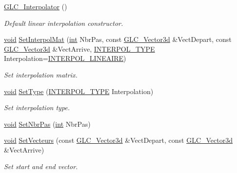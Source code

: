 \begin{DoxyCompactItemize}
\item 
\hyperlink{class_g_l_c___interpolator_acdcc7da44104df11b6f36e6ef273382b}{G\-L\-C\-\_\-\-Interpolator} ()
\begin{DoxyCompactList}\small\item\em Default linear interpolation constructor. \end{DoxyCompactList}\item 
\hyperlink{group___u_a_v_objects_plugin_ga444cf2ff3f0ecbe028adce838d373f5c}{void} \hyperlink{class_g_l_c___interpolator_af569e834641c14a0f50e16a650b00e83}{Set\-Interpol\-Mat} (\hyperlink{ioapi_8h_a787fa3cf048117ba7123753c1e74fcd6}{int} Nbr\-Pas, const \hyperlink{class_g_l_c___vector3d}{G\-L\-C\-\_\-\-Vector3d} \&Vect\-Depart, const \hyperlink{class_g_l_c___vector3d}{G\-L\-C\-\_\-\-Vector3d} \&Vect\-Arrive, \hyperlink{glc__interpolator_8h_a04f8c29ee182e2ad60d9a7a27d94e1b4}{I\-N\-T\-E\-R\-P\-O\-L\-\_\-\-T\-Y\-P\-E} Interpolation=\hyperlink{glc__interpolator_8h_a04f8c29ee182e2ad60d9a7a27d94e1b4a354ae4967893f536f9dc8384087ad56c}{I\-N\-T\-E\-R\-P\-O\-L\-\_\-\-L\-I\-N\-E\-A\-I\-R\-E})
\begin{DoxyCompactList}\small\item\em Set interpolation matrix. \end{DoxyCompactList}\item 
\hyperlink{group___u_a_v_objects_plugin_ga444cf2ff3f0ecbe028adce838d373f5c}{void} \hyperlink{class_g_l_c___interpolator_a1499c339a796381d865193795cfa37df}{Set\-Type} (\hyperlink{glc__interpolator_8h_a04f8c29ee182e2ad60d9a7a27d94e1b4}{I\-N\-T\-E\-R\-P\-O\-L\-\_\-\-T\-Y\-P\-E} Interpolation)
\begin{DoxyCompactList}\small\item\em Set interpolation type. \end{DoxyCompactList}\item 
\hyperlink{group___u_a_v_objects_plugin_ga444cf2ff3f0ecbe028adce838d373f5c}{void} \hyperlink{class_g_l_c___interpolator_ad04ecd5ffc7c0c2ed81dca38a6efa6d8}{Set\-Nbr\-Pas} (\hyperlink{ioapi_8h_a787fa3cf048117ba7123753c1e74fcd6}{int} Nbr\-Pas)
\item 
\hyperlink{group___u_a_v_objects_plugin_ga444cf2ff3f0ecbe028adce838d373f5c}{void} \hyperlink{class_g_l_c___interpolator_a876f362602cae9e21226676a87e27477}{Set\-Vecteurs} (const \hyperlink{class_g_l_c___vector3d}{G\-L\-C\-\_\-\-Vector3d} \&Vect\-Depart, const \hyperlink{class_g_l_c___vector3d}{G\-L\-C\-\_\-\-Vector3d} \&Vect\-Arrive)
\begin{DoxyCompactList}\small\item\em Set start and end vector. \end{DoxyCompactList}\item 

\end{DoxyCompactItemize}
